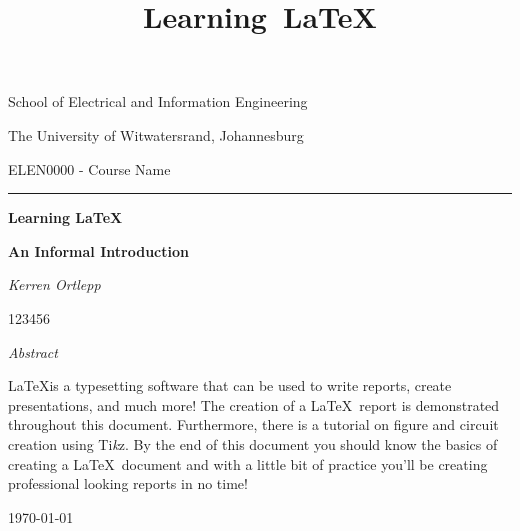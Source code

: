 \documentclass[12pt,a4paper,titlepage]{article}
\title{Learning\ \LaTeX}
\begin{document}
\begin{titlepage}
    \begin{minipage}{0.2\textwidth}
        
    \end{minipage}\hfill
    \begin{minipage}{0.65\textwidth}
        {\sffamily\large School of Electrical and Information Engineering}\par
        \vspace{0.35cm}
        {\sffamily\large The University of Witwatersrand, Johannesburg}\par
        \vspace{0.35cm}
        {\sffamily\large ELEN0000 - Course Name}
    \end{minipage}
    \par
    \vspace{0.2cm}
    \rule{\textwidth}{0.2pt}
    \centering

    {\vspace{3cm}\huge\bfseries Learning \LaTeX\par}
    \vspace{0.5cm}
    {\normalsize\bfseries An Informal Introduction\par}
    \vspace{3cm}
    {\Large\itshape Kerren Ortlepp\par}
    {123456}

    \vspace{3cm}

    \textit{Abstract}\\[0.3cm]
    \begin{minipage}{0.9\columnwidth}
    \small\noindent \LaTeX is a typesetting software that can be used to write reports, create presentations, and much more! The creation of a \LaTeX\ report is demonstrated throughout this document. Furthermore, there is a tutorial on figure and circuit creation using Ti\emph{k}z. By the end of this document you should know the basics of creating a \LaTeX\ document and with a little bit of practice you'll be creating professional looking reports in no time!
    \normalsize
    \end{minipage}

    \vfill

    {\large \today\par}

\end{titlepage}
\end{document}

